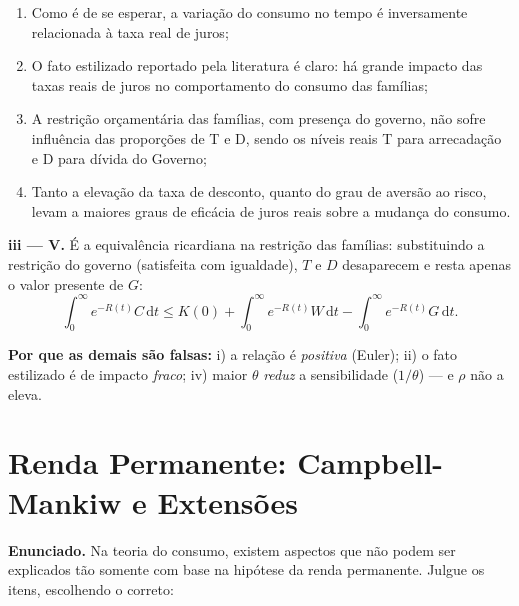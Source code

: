 \documentclass[12pt, a4paper]{article}
\newcommand{\dif}{\mathrm{d}}
\begin{document}
\begin{enumerate}[label=\roman*)]
\item Como é de se esperar, a variação do consumo no tempo é inversamente
relacionada à taxa real de juros;
\item O fato estilizado reportado pela literatura é claro: há grande impacto
das taxas reais de juros no comportamento do consumo das famílias;
\item A restrição orçamentária das famílias, com presença do governo, não
sofre influência das proporções de T e D, sendo os níveis reais T para
arrecadação e D para dívida do Governo;
\item Tanto a elevação da taxa de desconto, quanto do grau de aversão ao
risco, levam a maiores graus de eficácia de juros reais sobre a mudança do
consumo.
\end{enumerate}

\begin{correctbox}[title={Resposta: iii) --- reciclada: gabarito oficial da P2 2024 (Q2-iv)}]
\textbf{iii --- V.} É a equivalência ricardiana na restrição das famílias:
substituindo a restrição do governo (satisfeita com igualdade), $T$ e $D$
desaparecem e resta apenas o valor presente de $G$:
\[
\int_0^\infty e^{-R(t)}C\,\dif t \leq K(0) + \int_0^\infty e^{-R(t)}W\,\dif t
- \int_0^\infty e^{-R(t)}G\,\dif t.
\]

\textbf{Por que as demais são falsas:} i) a relação é \emph{positiva} (Euler);
ii) o fato estilizado é de impacto \emph{fraco}; iv) maior $\theta$
\emph{reduz} a sensibilidade ($1/\theta$) --- e $\rho$ não a eleva.
\end{correctbox}

\section{Renda Permanente: Campbell-Mankiw e Extensões}

\textbf{Enunciado.} Na teoria do consumo, existem aspectos que não podem ser
explicados tão somente com base na hipótese da renda permanente. Julgue os
itens, escolhendo o correto:
\end{document}
